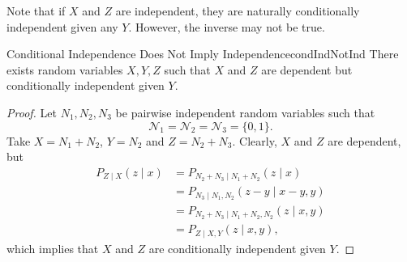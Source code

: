 \documentclass[math]{amznotes}
\theoremstyle{remark}
\begin{document}
Note that if $X$ and $Z$ are independent, they are naturally conditionally independent given any $Y$. However, the inverse may not be true.
\begin{probox}{Conditional Independence Does Not Imply Independence}{condIndNotInd}
    There exists random variables $X, Y, Z$ such that $X$ and $Z$ are dependent but conditionally independent given $Y$.
    \tcblower
    \begin{proof}
        Let $N_1, N_2, N_3$ be pairwise independent random variables such that 
        \begin{equation*}
            \mathcal{N}_1 = \mathcal{N}_2 = \mathcal{N}_3 = \{0, 1\}.
        \end{equation*}
        Take $X = N_1 + N_2$, $Y = N_2$ and $Z = N_2 + N_3$. Clearly, $X$ and $Z$ are dependent, but 
        \begin{align*}
            P_{Z \mid X}\left(z \mid x\right) & = P_{N_2 + N_3 \mid N_1 + N_2}\left(z \mid x\right) \\
            & = P_{N_3 \mid N_1, N_2}\left(z - y \mid x - y, y\right) \\
            & = P_{N_2 + N_3 \mid N_1 + N_2, N_2}\left(z \mid x, y\right) \\
            & = P_{Z \mid X, Y}\left(z \mid x, y\right),
        \end{align*}
        which implies that $X$ and $Z$ are conditionally independent given $Y$.
    \end{proof}
\end{probox}
\end{document}

